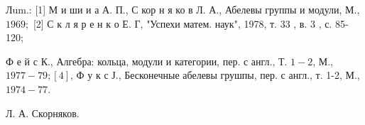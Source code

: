 \documentclass[10pt]{article}
\begin{document}
Лum.: [1] М и ши и а А. П., С кор н я ко в Л. А., Абелевы группы и модули, М., $1969 ;$ [2] С к л я р е н к о Е. Г, "Успехи матем. наук", 1978, т. 33 , в. 3 , с. 85-120;

Ф е й с К., Алгебра: кольца, модули и категории, пер. с англ., Т. $1-2$, М., $1977-79 ;[4]$, $Ф$ у к с Ј., Бесконечные абелевы грушпы, пер. с англ., т. 1-2, М., $1974-77$.



Л. А. Скорняков.
\end{document}
